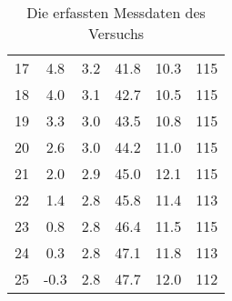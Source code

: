 \begin{table}
\begin{tabular}[]{S[table-format=2.0] S S[table-format=1.1] S S S[table-format=3.0]}
       17 &  4.8  &  3.2 & 41.8  &  10.3  &  115 \\
       18 &  4.0  &  3.1 & 42.7  &  10.5  &  115 \\
       19 &  3.3  &  3.0 & 43.5  &  10.8  &  115 \\
       20 &  2.6  &  3.0 & 44.2  &  11.0  &  115 \\
       21 &  2.0  &  2.9 & 45.0  &  12.1  &  115 \\
       22 &  1.4  &  2.8 & 45.8  &  11.4  &  113 \\
       23 &  0.8  &  2.8 & 46.4  &  11.5  &  115 \\
       24 &  0.3  &  2.8 & 47.1  &  11.8  &  113 \\
       25 & -0.3  &  2.8 & 47.7  &  12.0  &  112 \\
    \bottomrule
    \end{tabular}
    \caption[]{Die erfassten Messdaten des Versuchs}
    \label{tab:messdaten}
\end{table}